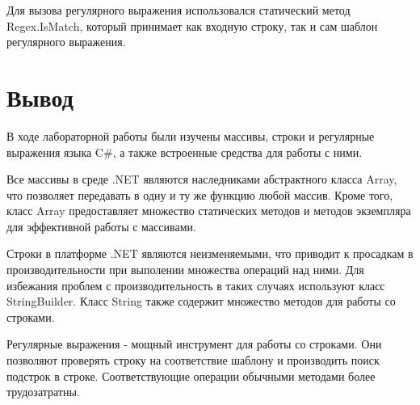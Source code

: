 \documentclass[a4paper,14pt]{extarticle}
\begin{document}
    Для вызова регулярного выражения использовался статический метод Regex.IsMatch,
    который принимает как входную строку, так и сам шаблон регулярного выражения.

    \section{Вывод}

    В ходе лабораторной работы были изучены массивы, строки и регулярные выражения
    языка C\#, а также встроенные средства для работы с ними. 
    
    Все массивы в среде .NET являются наследниками абстрактного класса Array,
    что позволяет передавать в одну и ту же функцию любой массив. Кроме того,
    класс Array предоставляет множество статических методов и методов экземпляра
    для эффективной работы с массивами.

    Строки в платформе .NET являются неизменяемыми, что приводит к просадкам в
    производительности при выполении множества операций над ними. Для избежания
    проблем с производительность в таких случаях используют класс StringBuilder.
    Класс String также содержит множество методов для работы со строками.

    Регулярные выражения - мощный инструмент для работы со строками. Они позволяют
    проверять строку на соответствие шаблону и производить поиск подстрок в строке.
    Соответствующие операции обычными методами более трудозатратны.
\end{document}
